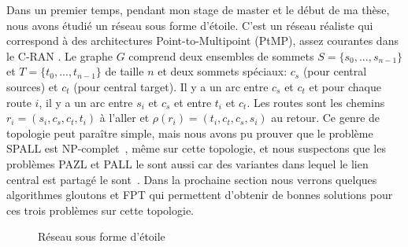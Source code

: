 \documentclass{article}
\begin{document}
	
Dans un premier temps, pendant mon stage de master et le début de ma thèse, nous avons étudié un réseau sous forme d'étoile. C'est un réseau réaliste qui correspond à des architectures Point-to-Multipoint (PtMP), assez courantes dans le C-RAN \cite{tayq2017real}. 
Le graphe $G$ comprend deux ensembles de sommets $S=\{s_0,...,s_{n-1}\}$ et $T=\{t_0,...,t_{n-1}\}$ de taille $n$ et deux sommets spéciaux: {\bf $c_s$} (pour central sources) et {\bf $c_t$} (pour central target).
    Il y a un arc entre {\bf $c_s$} et {\bf $c_t$} et pour chaque route $i$, il y a un arc entre $s_i$ et $c_s$ et entre $t_i$ et $c_t$.
      Les routes sont les chemins $r_i = (s_i,c_s,c_t,t_i)$ à l'aller et  $\rho(r_i) = (t_i,c_t,c_s,s_i)$ au retour. 
      Ce genre de topologie peut paraître simple, mais nous avons pu prouver que le problème SPALL est NP-complet~\cite{orman1997complexity}, même sur cette topologie, et nous suspectons que les problèmes PAZL et PALL le sont aussi car des variantes dans lequel le lien central est partagé le sont~\cite{yu2004minimizing}. Dans la prochaine section nous verrons quelques algorithmes gloutons et FPT qui permettent d'obtenir de bonnes solutions pour ces trois problèmes sur cette topologie.
      \begin{figure}
       \begin{center}

  \end{center}
  \caption{Réseau sous forme d'étoile}
  \end{figure}
  
\end{document}
